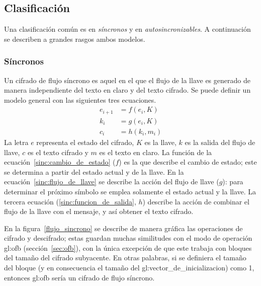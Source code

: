 %
%

\subsection{Clasificación}

Una clasificación común es en \textit{síncronos} y
en \textit{autosincronizables}. A continuación se describen a grandes rasgos
ambos modelos.

\subsubsection{Síncronos}

Un cifrado de flujo síncrono es aquel en el que el flujo de la llave es
generado de manera independiente del texto en claro y del texto cifrado. Se
puede definir un modelo general con las siguientes tres ecuaciones.
\begin{align}
  \label{sinc:cambio_de_estado}
  e_{i+1} &= f(e_i, K) \\
  \label{sinc:flujo_de_llave}
  k_i &= g(e_i, K) \\
  \label{sinc:funcion_de_salida}
  c_i &= h(k_i, m_i)
\end{align}
La letra $ e $ representa el estado del cifrado, $ K $ es la llave, $ k $ es
la salida del flujo de llave, $ c $ es el texto cifrado y $ m $ es el texto en
claro. La función de la ecuación~\ref{sinc:cambio_de_estado} ($ f $) es la que
describe el cambio de estado; este se determina a partir del estado actual y
de la llave. En la ecuación~\ref{sinc:flujo_de_llave} se describe la acción del
flujo de llave ($ g $): para determinar el próximo símbolo se emplea solamente
el estado actual y la llave. La tercera ecuación (\ref{sinc:funcion_de_salida},
$ h $) describe la acción de combinar el flujo de la llave con el mensaje, y
así obtener el texto cifrado.

En la figura~\ref{flujo_sincrono} se describe de manera gráfica las operaciones
de cifrado y descifrado; estas guardan muchas similitudes con el modo de
operación \gls{gl:ofb} (sección~\ref{sec:ofb}), con la única excepción de
que este trabaja con bloques del tamaño del cifrado subyacente. En otras
palabras, si se definiera el tamaño del bloque (y en consecuencia el tamaño del
\gls{gl:vector_de_inicializacion}) como 1, entonces \gls{gl:ofb} sería un
cifrado de flujo síncrono.

